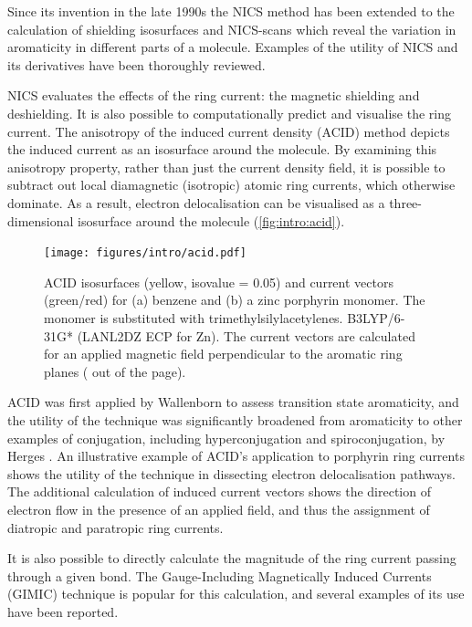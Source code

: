 			Since its invention in the late 1990s the NICS method has been extended to the calculation of shielding isosurfaces\autocite{Klod2001} and NICS-scans\autocite{Gershoni-Poranne2014} which reveal the variation in aromaticity in different parts of a molecule.\autocite{Stanger2006,Gershoni-Poranne2014} Examples of the utility of NICS and its derivatives have been thoroughly reviewed.\autocite{Chen2005,Gershoni-Poranne2015} 

			NICS evaluates the effects of the ring current: the magnetic shielding and deshielding. It is also possible to computationally predict and visualise the ring current. The anisotropy of the induced current density (ACID) method depicts the induced current as an isosurface around the molecule.\autocite{Herges2001} By examining this anisotropy property, rather than just the current density field, it is possible to subtract out local diamagnetic (isotropic) atomic ring currents, which otherwise dominate. As a result, electron delocalisation can be visualised as a three-dimensional isosurface around the molecule (\autoref{fig:intro:acid}).

			\begin{figure}[ht!]
				\centering\texttt{[image: figures/intro/acid.pdf]} 
				\caption[]{ACID isosurfaces (yellow, isovalue = 0.05) and current vectors (green/red) for (a) benzene and (b) a zinc porphyrin monomer. The monomer is substituted with trimethylsilylacetylenes. B3LYP/6-31G* (LANL2DZ ECP for Zn). The current vectors are calculated for an applied magnetic field perpendicular to the aromatic ring planes ( out of the page).}
				\label{fig:intro:acid}
			\end{figure}


			ACID was first applied by Wallenborn  to assess transition state aromaticity,\autocite{Wallenborn1998} and the utility of the technique was significantly broadened from aromaticity to other examples of conjugation, including hyperconjugation and spiroconjugation, by Herges .\autocite{Herges2001,Geuenich2005} An illustrative example of ACID's application to porphyrin ring currents shows the utility of the technique in dissecting electron delocalisation pathways.\autocite{Wu2013} The additional calculation of induced current vectors shows the direction of electron flow in the presence of an applied field, and thus the assignment of diatropic and paratropic ring currents.\autocite{Geuenich2005}

			It is also possible to directly calculate the magnitude of the ring current passing through a given bond. The Gauge-Including Magnetically Induced Currents (GIMIC) technique is popular for this calculation, and several examples of its use have been reported.\autocite{GIMIC2004,Fliegl2009,Fliegl2012}


